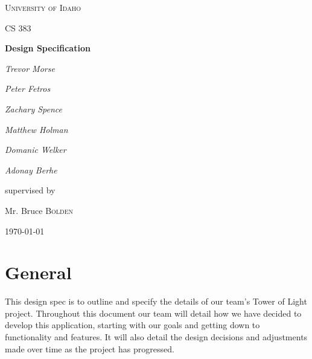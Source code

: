 \documentclass[12pt]{extarticle}
\begin{document}
\begin{titlepage}
	\centering
	{\scshape\LARGE University of Idaho \par}
	\vspace{1cm}
	{\scshape\Large CS 383\par}
	\vspace{1.5cm}
	{\huge\bfseries Design Specification\par}
	\vspace{2cm}
	{\Large\itshape Trevor Morse\par}
	{\Large\itshape Peter Fetros\par}
	{\Large\itshape Zachary Spence\par}
	{\Large\itshape Matthew Holman\par}
	{\Large\itshape Domanic Welker\par}
	{\Large\itshape Adonay Berhe\par}
	\vfill
	supervised by\par
	Mr. Bruce \textsc{Bolden}
	
	\vfill
	
	{\large \today\par}
\end{titlepage}


\clearpage
\tableofcontents

\clearpage

\section{General}
This design spec is to outline and specify the details of our team's Tower of Light project. Throughout this document our team will detail how we have decided to develop this application, starting with our goals and getting down to functionality and features.  It will also detail the design decisions and adjustments made over time as the project has progressed.
\end{document}
